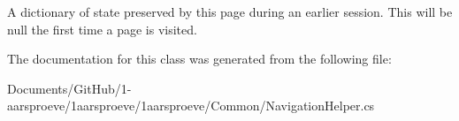 A dictionary of state preserved by this page during an earlier session. This will be null the first time a page is visited. 



The documentation for this class was generated from the following file\+:\begin{DoxyCompactItemize}
\item 
Documents/\+Git\+Hub/1-\/aarsproeve/1aarsproeve/1aarsproeve/\+Common/Navigation\+Helper.\+cs\end{DoxyCompactItemize}
